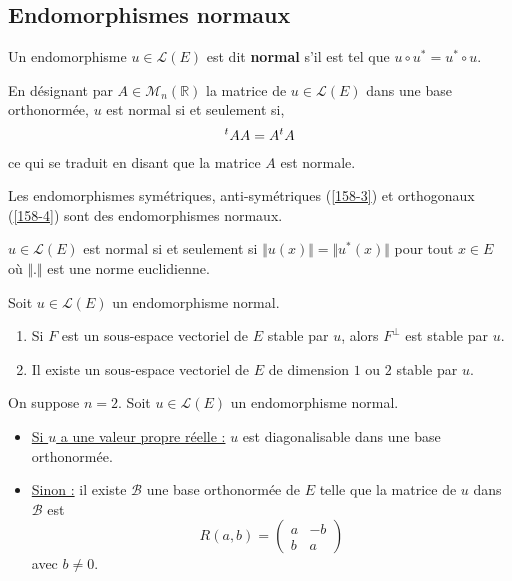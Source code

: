   \subsection{Endomorphismes normaux}


  \begin{definition}
    Un endomorphisme $u \in \mathcal{L}(E)$ est dit \textbf{normal} s'il est tel que $u \circ u^* = u^* \circ u$.
  \end{definition}

  \begin{remark}
    En désignant par $A \in \mathcal{M}_n(\mathbb{R})$ la matrice de $u \in \mathcal{L}(E)$ dans une base orthonormée, $u$ est normal si et seulement si,
    \[ \mathstrut ^t A A = A \mathstrut ^t A \]
    ce qui se traduit en disant que la matrice $A$ est normale.
  \end{remark}

  \begin{example}
    Les endomorphismes symétriques, anti-symétriques (\cref{158-3}) et orthogonaux (\cref{158-4}) sont des endomorphismes normaux.
  \end{example}


  \begin{proposition}
    $u \in \mathcal{L}(E)$ est normal si et seulement si $\Vert u (x) \Vert = \Vert u^* (x) \Vert$ pour tout $x \in E$ où $\Vert . \Vert$ est une norme euclidienne.
  \end{proposition}


  \begin{proposition}
    Soit $u \in \mathcal{L}(E)$ un endomorphisme normal.
    \begin{enumerate}[label=(\roman*)]
      \item Si $F$ est un sous-espace vectoriel de $E$ stable par $u$, alors $F^\perp$ est stable par $u$.
      \item Il existe un sous-espace vectoriel de $E$ de dimension $1$ ou $2$ stable par $u$.
    \end{enumerate}
  \end{proposition}

  \begin{proposition}[Réduction dans le cas $n = 2$]
    \label{158-2}
    On suppose $n = 2$. Soit $u \in \mathcal{L}(E)$ un endomorphisme normal.
    \begin{itemize}
      \item \uline{Si $u$ a une valeur propre réelle :} $u$ est diagonalisable dans une base orthonormée.
      \item \uline{Sinon :} il existe $\mathcal{B}$ une base orthonormée de $E$ telle que la matrice de $u$ dans $\mathcal{B}$ est
      \[ R(a,b) = \begin{pmatrix} a & -b \\ b & a \end{pmatrix} \]
      avec $b \neq 0$.
    \end{itemize}
  \end{proposition}

